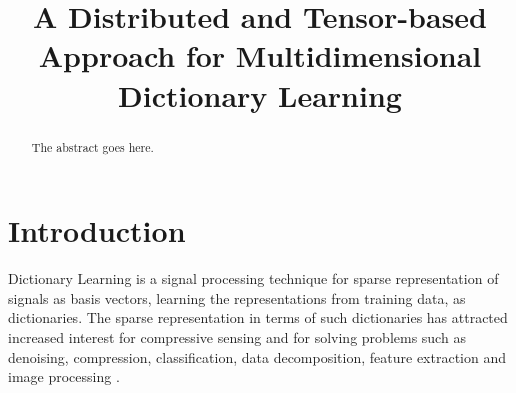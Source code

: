 \documentclass[conference]{IEEEtran}
\begin{document}
\title{A Distributed and Tensor-based Approach for Multidimensional Dictionary Learning}


\author{

\and


\and


}


\maketitle


\begin{abstract}
The abstract goes here.
\end{abstract}

\IEEEpeerreviewmaketitle

\section{Introduction}

Dictionary Learning is a signal processing technique for sparse representation of signals as basis vectors, learning the representations from training data, as dictionaries. The sparse representation in terms of such dictionaries has attracted increased interest for compressive sensing and for solving problems such as denoising, compression, classification, data decomposition, feature extraction and image processing \cite{tosic2011dictionary, zhang2010discriminative, zhu2016coupled,ravishankar2011mr}.
\end{document}
